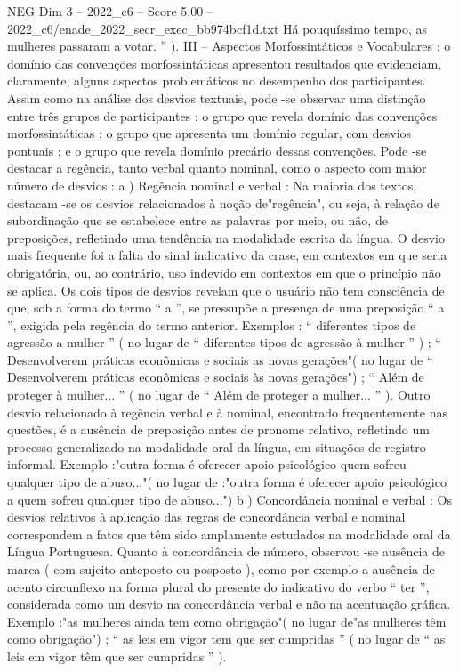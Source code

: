 \begin{textsample}{NEG Dim 3 – 2022\_c6 – Score 5.00 – 2022\_c6/enade\_2022\_secr\_exec\_bb974bcf1d.txt}
Há pouquíssimo tempo, as mulheres passaram a votar. ” ).
III – Aspectos Morfossintáticos e Vocabulares : o domínio das convenções morfossintáticas apresentou resultados que evidenciam, claramente, alguns aspectos problemáticos no desempenho dos participantes.
Assim como na análise dos desvios textuais, pode -se observar uma distinção entre três grupos de participantes : o grupo que revela domínio das convenções morfossintáticas ; o grupo que apresenta um domínio regular, com desvios pontuais ; e o grupo que revela domínio precário dessas convenções.
Pode -se destacar a regência, tanto verbal quanto nominal, como o aspecto com maior número de desvios : a ) Regência nominal e verbal : Na maioria dos textos, destacam -se os desvios relacionados à noção de"regência", ou seja, à relação de subordinação que se estabelece entre as palavras por meio, ou não, de preposições, refletindo uma tendência na modalidade escrita da língua.
O desvio mais frequente foi a falta do sinal indicativo da crase, em contextos em que seria obrigatória, ou, ao contrário, uso indevido em contextos em que o princípio não se aplica.
Os dois tipos de desvios revelam que o usuário não tem consciência de que, sob a forma do termo “ a ”, se pressupõe a presença de uma preposição “ a ”, exigida pela regência do termo anterior.
Exemplos : “ diferentes tipos de agressão a mulher ” ( no lugar de “ diferentes tipos de agressão à mulher ” ) ; “ Desenvolverem práticas econômicas e sociais as novas gerações"( no lugar de “ Desenvolverem práticas econômicas e sociais às novas gerações") ; “ Além de proteger à mulher... ” ( no lugar de “ Além de proteger a mulher... ” ).
Outro desvio relacionado à regência verbal e à nominal, encontrado frequentemente nas questões, é a ausência de preposição antes de pronome relativo, refletindo um processo generalizado na modalidade oral da língua, em situações de registro informal.
Exemplo :"outra forma é oferecer apoio psicológico quem sofreu qualquer tipo de abuso..."( no lugar de :"outra forma é oferecer apoio psicológico a quem sofreu qualquer tipo de abuso...") b ) Concordância nominal e verbal : Os desvios relativos à aplicação das regras de concordância verbal e nominal correspondem a fatos que têm sido amplamente estudados na modalidade oral da Língua Portuguesa.
Quanto à concordância de número, observou -se ausência de marca ( com sujeito anteposto ou posposto ), como por exemplo a ausência de acento circunflexo na forma plural do presente do indicativo do verbo “ ter ”, considerada como um desvio na concordância verbal e não na acentuação gráfica.
Exemplo :"as mulheres ainda tem como obrigação"( no lugar de"as mulheres têm como obrigação") ; “ as leis em vigor tem que ser cumpridas ” ( no lugar de “ as leis em vigor têm que ser cumpridas ” ).

\end{textsample}
